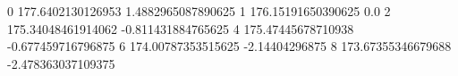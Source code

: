 0 177.6402130126953 1.4882965087890625
1 176.15191650390625 0.0
2 175.34048461914062 -0.811431884765625
4 175.47445678710938 -0.677459716796875
6 174.00787353515625 -2.14404296875
8 173.67355346679688 -2.478363037109375
